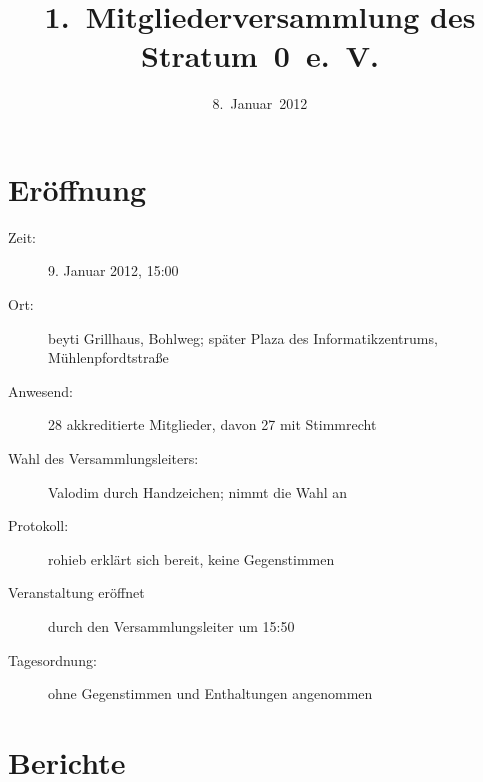 \documentclass[a4paper,12pt]{scrartcl}
\title{1.~Mitgliederversammlung des Stratum~0~e.~V.}
\date{8.~Januar~2012}
\begin{document}
\maketitle

\section{Eröffnung}
\begin{description}
  \item[Zeit:] 9. Januar 2012, 15:00
  \item[Ort:] beyti Grillhaus, Bohlweg; später Plaza des Informatikzentrums,
    Mühlenpfordtstraße
  \item[Anwesend:] 28 akkreditierte Mitglieder, davon 27 mit Stimmrecht
  \item[Wahl des Versammlungsleiters:] Valodim durch Handzeichen; nimmt die
    Wahl an
  \item[Protokoll:] rohieb erklärt sich bereit, keine Gegenstimmen
  \item[Veranstaltung eröffnet] durch den Versammlungsleiter um 15:50
  \item[Tagesordnung:] ohne Gegenstimmen und Enthaltungen angenommen
\end{description}

\section{Berichte}
\end{document}
